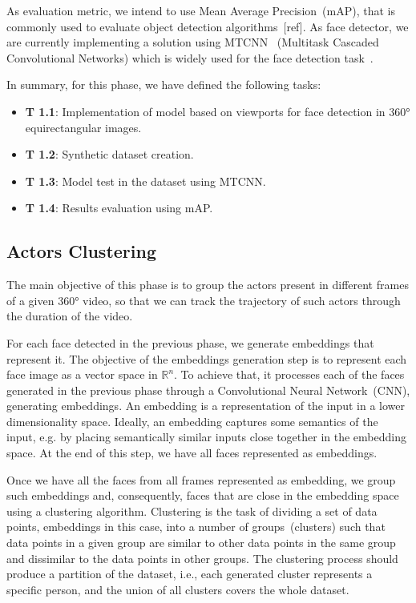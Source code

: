 As evaluation metric, we intend to use Mean Average Precision~(mAP), that is commonly used to evaluate object detection algorithms~[ref]. As face detector, we are currently implementing a solution using MTCNN~\cite{mtcnn} (Multitask Cascaded Convolutional Networks) which is widely used for the face detection task~\cite{mtcnn1, mtcnn2, mtcnn3}. %

In summary, for this phase, we have defined the following tasks:

\begin{itemize}
    \item \textbf{T 1.1}: Implementation of model based on viewports for face detection in 360° equirectangular images.
    \item \textbf{T 1.2}: Synthetic dataset creation.
    \item \textbf{T 1.3}: Model test in the dataset using MTCNN.
    \item \textbf{T 1.4}: Results evaluation using mAP.
\end{itemize}


\subsection{Actors Clustering}

The main objective of this phase is to group the actors present in different frames of a given 360° video, so that we can track the trajectory of such actors through the duration of the video. 

For each face detected in the previous phase, we generate embeddings that represent it.
The objective of the embeddings generation step is to represent each face image as a vector space in $\mathbb{R}^{n}$.
To achieve that, it processes each of the faces generated in the previous phase through a Convolutional Neural Network~(CNN), generating embeddings. 
An embedding is a representation of the input in a lower dimensionality space.
Ideally, an embedding captures some semantics of the input, e.g. by placing semantically similar inputs close together in the embedding space.
%
At the end of this step, we have all faces represented as embeddings.

Once we have all the faces from all frames represented as embedding, we group such embeddings and, consequently, faces that are close in the embedding space using a clustering algorithm. 
%
Clustering is the task of dividing a set of data points, embeddings in this case, into a number of groups~(clusters) such that data points in a given group are similar to other data points in the same group and dissimilar to the data points in other groups.
The clustering process should produce a partition of the dataset, i.e., each generated cluster represents a specific person, and the union of all clusters covers the whole dataset.

